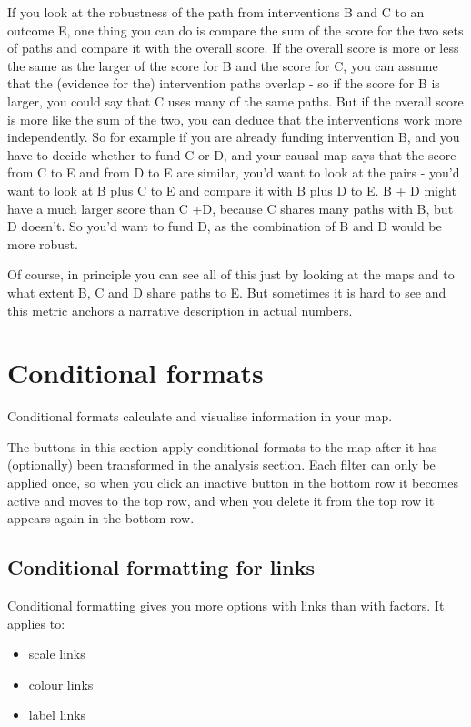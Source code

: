\documentclass[
]{book}
\providecommand{\tightlist}{%
  \setlength{\itemsep}{0pt}\setlength{\parskip}{0pt}}
\begin{document}
If you look at the robustness of the path from interventions B and C to an outcome E, one thing you can do is compare the sum of the score for the two sets of paths and compare it with the overall score. If the overall score is more or less the same as the larger of the score for B and the score for C, you can assume that the (evidence for the) intervention paths overlap - so if the score for B is larger, you could say that C uses many of the same paths. But if the overall score is more like the sum of the two, you can deduce that the interventions work more independently. So for example if you are already funding intervention B, and you have to decide whether to fund C or D, and your causal map says that the score from C to E and from D to E are similar, you'd want to look at the pairs - you'd want to look at B plus C to E and compare it with B plus D to E. B + D might have a much larger score than C +D, because C shares many paths with B, but D doesn't. So you'd want to fund D, as the combination of B and D would be more robust.

Of course, in principle you can see all of this just by looking at the maps and to what extent B, C and D share paths to E. But sometimes it is hard to see and this metric anchors a narrative description in actual numbers.

\hypertarget{xconditional-formats}{%
\chapter{Conditional formats}\label{xconditional-formats}}

Conditional formats calculate and visualise information in your map.

The buttons in this section apply conditional formats to the map after it has (optionally) been transformed in the analysis section. Each filter can only be applied once, so when you click an inactive button in the bottom row it becomes active and moves to the top row, and when you delete it from the top row it appears again in the bottom row.

\hypertarget{xformatting-links}{%
\section{Conditional formatting for links}\label{xformatting-links}}

Conditional formatting gives you more options with links than with factors. It applies to:

\begin{itemize}
\tightlist
\item
  scale links
\item
  colour links
\item
  label links
\end{itemize}
\end{document}
